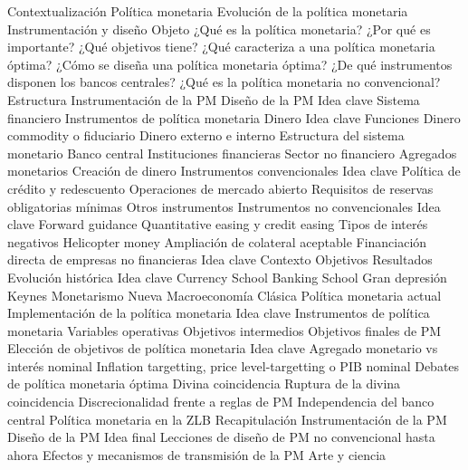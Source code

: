 \documentclass{nuevotema}
\begin{document}
\begin{esquema}[enumerate]
	\1[] 
		\2 Contextualización
			\3 Política monetaria
			\3 Evolución de la política monetaria
			\3 Instrumentación y diseño
		\2 Objeto
			\3 ¿Qué es la política monetaria? ¿Por qué es importante?
			\3 ¿Qué objetivos tiene?
			\3 ¿Qué caracteriza a una política monetaria óptima?
			\3 ¿Cómo se diseña una política monetaria óptima?
			\3 ¿De qué instrumentos disponen los bancos centrales?
			\3 ¿Qué es la política monetaria no convencional?
		\2 Estructura
			\3 Instrumentación de la PM
			\3 Diseño de la PM
	\1 
		\2 Idea clave
			\3 Sistema financiero
			\3 Instrumentos de política monetaria
		\2 Dinero
			\3 Idea clave
			\3 Funciones
			\3 Dinero commodity o fiduciario
			\3 Dinero externo e interno
		\2 Estructura del sistema monetario
			\3 Banco central
			\3 Instituciones financieras
			\3 Sector no financiero
			\3 Agregados monetarios
			\3 Creación de dinero
		\2 Instrumentos convencionales
			\3 Idea clave
			\3 Política de crédito y redescuento
			\3 Operaciones de mercado abierto
			\3 Requisitos de reservas obligatorias mínimas
			\3 Otros instrumentos
		\2 Instrumentos no convencionales
			\3 Idea clave
			\3 Forward guidance
			\3 Quantitative easing y credit easing
			\3 Tipos de interés negativos
			\3 Helicopter money
			\3 Ampliación de colateral aceptable
			\3 Financiación directa de empresas no financieras
	\1 
		\2 Idea clave
			\3 Contexto
			\3 Objetivos
			\3 Resultados
		\2 Evolución histórica
			\3 Idea clave
			\3 Currency School
			\3 Banking School
			\3 Gran depresión
			\3 Keynes
			\3 Monetarismo
			\3 Nueva Macroeconomía Clásica
			\3 Política monetaria actual
		\2 Implementación de la política monetaria
			\3 Idea clave
			\3 Instrumentos de política monetaria
			\3 Variables operativas
			\3 Objetivos intermedios
			\3 Objetivos finales de PM
		\2 Elección de objetivos de política monetaria
			\3 Idea clave
			\3 Agregado monetario vs interés nominal
			\3 Inflation targetting, price level-targetting o PIB nominal
		\2 Debates de política monetaria óptima
			\3 Divina coincidencia
			\3 Ruptura de la divina coincidencia
			\3 Discrecionalidad frente a reglas de PM
			\3 Independencia del banco central
			\3 Política monetaria en la ZLB
	\1[] 
		\2 Recapitulación
			\3 Instrumentación de la PM
			\3 Diseño de la PM
		\2 Idea final
			\3 Lecciones de diseño de PM no convencional hasta ahora
			\3 Efectos y mecanismos de transmisión de la PM
			\3 Arte y ciencia

\end{esquema}
\end{document}
